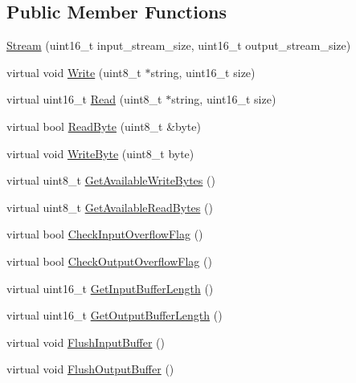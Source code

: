 \subsection*{Public Member Functions}
\begin{DoxyCompactItemize}
\item 
\hyperlink{class_stream_a2b738d6f4d3059de2ae3d444d68663bf}{Stream} (uint16\+\_\+t input\+\_\+stream\+\_\+size, uint16\+\_\+t output\+\_\+stream\+\_\+size)
\item 
virtual void \hyperlink{class_stream_a508be3423e4d99ab2757275fb723002a}{Write} (uint8\+\_\+t $\ast$string, uint16\+\_\+t size)
\item 
virtual uint16\+\_\+t \hyperlink{class_stream_a851572e5787cd98383d5118de378724b}{Read} (uint8\+\_\+t $\ast$string, uint16\+\_\+t size)
\item 
virtual bool \hyperlink{class_stream_a6db4180f5834073f992608b856bddca2}{Read\+Byte} (uint8\+\_\+t \&byte)
\item 
virtual void \hyperlink{class_stream_aeaed767b3a8d946c6f81465fa83ff17f}{Write\+Byte} (uint8\+\_\+t byte)
\item 
virtual uint8\+\_\+t \hyperlink{class_stream_a6a16ddb03d3360cef4daf4d38245091d}{Get\+Available\+Write\+Bytes} ()
\item 
virtual uint8\+\_\+t \hyperlink{class_stream_a71cec6c46f3d50cc3ab420e93ae434e1}{Get\+Available\+Read\+Bytes} ()
\item 
virtual bool \hyperlink{class_stream_a088c4e68d568acfad715c56f408fe9f8}{Check\+Input\+Overflow\+Flag} ()
\item 
virtual bool \hyperlink{class_stream_aee6c201819b874c5934a270592d9d311}{Check\+Output\+Overflow\+Flag} ()
\item 
virtual uint16\+\_\+t \hyperlink{class_stream_a4860b9602c68ab437520d321e4e97212}{Get\+Input\+Buffer\+Length} ()
\item 
virtual uint16\+\_\+t \hyperlink{class_stream_ad8aea9131dbc1b422bdba2408d63492a}{Get\+Output\+Buffer\+Length} ()
\item 
virtual void \hyperlink{class_stream_ac7e3629626c1ea4d9cba88db1e048132}{Flush\+Input\+Buffer} ()
\item 
virtual void \hyperlink{class_stream_a0af6193f98fcf7bcd60eef84fce8699c}{Flush\+Output\+Buffer} ()
\end{DoxyCompactItemize}

